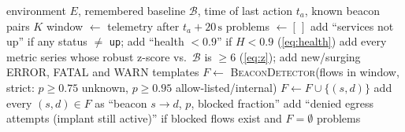 \documentclass[11pt,a4paper]{article}
\newcommand{\code}[1]{\texttt{#1}}
\begin{document}
\begin{algorithm}[H]
\caption{Verification gate (\code{EvidenceBuilder.verify}, \code{Evidence.problems})}
\label{alg:verify}
\begin{algorithmic}[1]
\Require environment $E$, remembered baseline $\mathcal{B}$, time of last action $t_a$, known beacon pairs $K$
\State window $\gets$ telemetry after $t_a + 20\,\mathrm{s}$ 
\State problems $\gets[\,]$
\State add ``services not up'' if any status $\ne$ \code{up};\; add ``health $<0.9$'' if $H<0.9$ (\cref{eq:health})
\State add every metric series whose robust z-score vs.\ $\mathcal{B}$ is $\ge6$ (\cref{eq:z}); add new/surging ERROR, FATAL and WARN templates
\State $F \gets$ \textsc{BeaconDetector}(flows in window, strict: $p\ge0.75$ unknown, $p\ge0.95$ allow-listed/internal)
 
   \State $F \gets F \cup \{(s,d)\}$ \EndIf
\EndFor
\State add every $(s,d)\in F$ as ``beacon $s\to d$, $p$, blocked fraction''
\State add ``denied egress attempts (implant still active)'' if blocked flows exist and $F=\emptyset$
\State \Return problems 
\end{algorithmic}
\end{algorithm}
\end{document}
